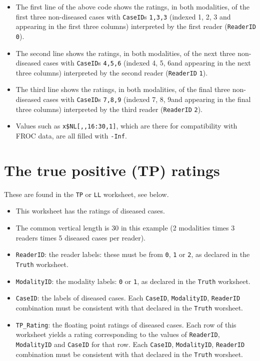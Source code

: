\documentclass[
]{book}
\providecommand{\tightlist}{%
  \setlength{\itemsep}{0pt}\setlength{\parskip}{0pt}}
\begin{document}
\begin{itemize}
\tightlist
\item
  The first line of the above code shows the ratings, in both modalities, of the first three non-diseased cases with \texttt{CaseID}s \texttt{1,3,3} (indexed 1, 2, 3 and appearing in the first three columns) interpreted by the first reader (\texttt{ReaderID} \texttt{0}).
\item
  The second line shows the ratings, in both modalities, of the next three non-diseased cases with \texttt{CaseID}s \texttt{4,5,6} (indexed 4, 5, 6and appearing in the next three columns) interpreted by the second reader (\texttt{ReaderID} \texttt{1}).
\item
  The third line shows the ratings, in both modalities, of the final three non-diseased cases with \texttt{CaseID}s \texttt{7,8,9} (indexed 7, 8, 9and appearing in the final three columns) interpreted by the third reader (\texttt{ReaderID} \texttt{2}).
\item
  Values such as \texttt{x\$NL{[},,16:30,1{]}}, which are there for compatibility with FROC data, are all filled with \texttt{-Inf}.
\end{itemize}

\hypertarget{the-true-positive-tp-ratings-3}{%
\section{The true positive (TP) ratings}\label{the-true-positive-tp-ratings-3}}

These are found in the \texttt{TP} or \texttt{LL} worksheet, see below.

\begin{itemize}
\tightlist
\item
  This worksheet has the ratings of diseased cases.
\item
  The common vertical length is 30 in this example (2 modalities times 3 readers times 5 diseased cases per reader).
\item
  \texttt{ReaderID}: the reader labels: these must be from \texttt{0}, \texttt{1} or \texttt{2}, as declared in the \texttt{Truth} worksheet.
\item
  \texttt{ModalityID}: the modality labels: \texttt{0} or \texttt{1}, as declared in the \texttt{Truth} worksheet.
\item
  \texttt{CaseID}: the labels of diseased cases. Each \texttt{CaseID}, \texttt{ModalityID}, \texttt{ReaderID} combination must be consistent with that declared in the \texttt{Truth} worsheet.\\
\item
  \texttt{TP\_Rating}: the floating point ratings of diseased cases. Each row of this worksheet yields a rating corresponding to the values of \texttt{ReaderID}, \texttt{ModalityID} and \texttt{CaseID} for that row. Each \texttt{CaseID}, \texttt{ModalityID}, \texttt{ReaderID} combination must be consistent with that declared in the \texttt{Truth} worsheet.
\end{itemize}
\end{document}
